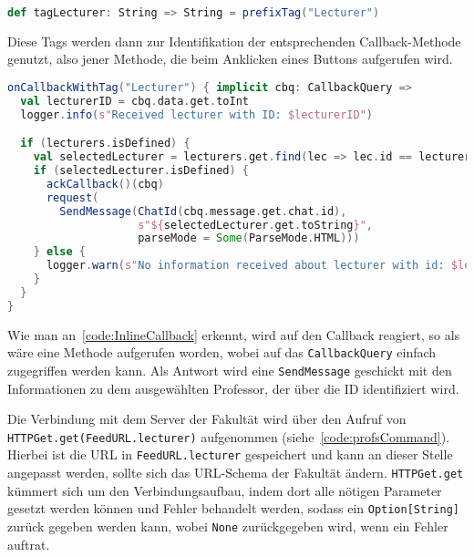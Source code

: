 \begin{lstlisting}[language=scala, style=scala, caption=Benutzung von Tags zur Identifikation von Callback-Methoden]
def tagLecturer: String => String = prefixTag("Lecturer")
\end{lstlisting}

Diese Tags werden dann zur Identifikation der entsprechenden Callback-Methode genutzt, also jener Methode, die beim Anklicken eines Buttons aufgerufen wird.

\begin{lstlisting}[language=scala, style=scala, caption=Callback-Funktionalität bei Inline-Buttons, label=code:InlineCallback]
onCallbackWithTag("Lecturer") { implicit cbq: CallbackQuery =>
  val lecturerID = cbq.data.get.toInt
  logger.info(s"Received lecturer with ID: $lecturerID")

  if (lecturers.isDefined) {
    val selectedLecturer = lecturers.get.find(lec => lec.id == lecturerID)
    if (selectedLecturer.isDefined) {
      ackCallback()(cbq)
      request(
        SendMessage(ChatId(cbq.message.get.chat.id),
                    s"${selectedLecturer.get.toString}",
                    parseMode = Some(ParseMode.HTML)))
    } else {
      logger.warn(s"No information received about lecturer with id: $lecturerID")
    }
  }
}
\end{lstlisting}

Wie man an~\autoref{code:InlineCallback} erkennt, wird auf den Callback reagiert, so als wäre eine Methode aufgerufen worden, wobei auf das \texttt{CallbackQuery} einfach zugegriffen werden kann. Als Antwort wird eine \texttt{SendMessage} geschickt mit den Informationen zu dem ausgewählten Professor, der über die ID identifiziert wird.

Die Verbindung mit dem Server der Fakultät wird über den Aufruf von \texttt{HTTPGet\allowbreak.get(\allowbreak FeedURL\allowbreak.lecturer)} aufgenommen (siehe~\autoref{code:profsCommand}). Hierbei ist die URL in \texttt{FeedURL\allowbreak.lecturer} gespeichert und kann an dieser Stelle angepasst werden, sollte sich das URL-Schema der Fakultät ändern. \texttt{HTTPGet.get} kümmert sich um den Verbindungsaufbau, indem dort alle nötigen Parameter gesetzt werden können und Fehler behandelt werden, sodass ein \texttt{Option[String]} zurück gegeben werden kann, wobei \texttt{None} zurückgegeben wird, wenn ein Fehler auftrat.
